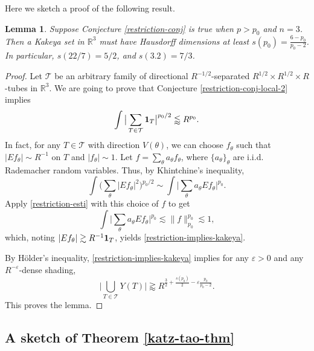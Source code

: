 \documentclass{amsart}
\numberwithin{equation}{section}
\newtheorem{lemma}[theorem]{Lemma}
\newcommand{\e}{\varepsilon}
\newcommand{\ZR}{\mathbb{R}}
\newcommand{\Id}{{\bf 1}}
\newcommand{\cT}{{\mathcal T}}
\begin{document}
Here we sketch a proof of the following result.
\begin{lemma}
Suppose Conjecture \ref{restriction-conj} is true when $p>p_0$ and $n=3$. 
Then a Kakeya set in $\ZR^3$ must have Hausdorff dimensions at least $s(p_0)=\frac{6-p_0}{p_0-2}$. 
In particular, $s(22/7)=5/2$, and $s(3.2)=7/3$.
\end{lemma}
\begin{proof}
Let $\cT$ be an arbitrary family of directional $R^{-1/2}$-separated $R^{1/2}\times R^{1/2}\times R$-tubes in $\ZR^3$. 
We are going to prove that Conjecture \ref{restriction-conj-local-2} implies 
\begin{equation}
\label{restriction-implies-kakeya}
    \int\big|\sum_{T\in\cT}\Id_T\big|^{p_0/2}\lessapprox R^{p_0}.
\end{equation}
In fact, for any $T\in\cT$ with direction $V(\theta)$, we can choose $f_\theta$ such that $|Ef_{\theta}|\sim R^{-1}$ on $T$ and $|f_\theta|\sim1$.
Let $f=\sum_\theta a_\theta f_\theta$, where $\{a_\theta\}_{\theta}$ are i.i.d. Rademacher random variables.
Thus, by Khintchine's inequality,
\begin{equation}
    \int \big(\sum_{\theta}|Ef_\theta|^2\big)^{p_0/2}\sim\int\big|\sum_{\theta}a_\theta Ef_\theta\big|^{p_0}.
\end{equation}
Apply \eqref{restriction-esti} with this choice of $f$ to get
\begin{equation}
    \int\big|\sum_{\theta}a_\theta Ef_\theta\big|^{p_0}\lesssim\|f\|_{p_0}^{p_0}\lesssim1,
\end{equation}
which, noting $|Ef_\theta|\gtrsim R^{-1}\Id_T$, yields \eqref{restriction-implies-kakeya}.

\smallskip

By H\"older's inequality, \eqref{restriction-implies-kakeya} implies for any $\e>0$  and any $R^{-\e}$-dense shading,
\begin{equation}
    \big|\bigcup_{T\in \cT} Y(T) \big|\gtrapprox  R^{\frac{3}{2}+\frac{s(p_0)}{2} -\e \frac{p_0}{p_0-2}} .
\end{equation}
This proves the lemma.
\end{proof}

\medskip

\subsection{A sketch of Theorem \ref{katz-tao-thm}}
\label{sketch-KT}
\end{document}
